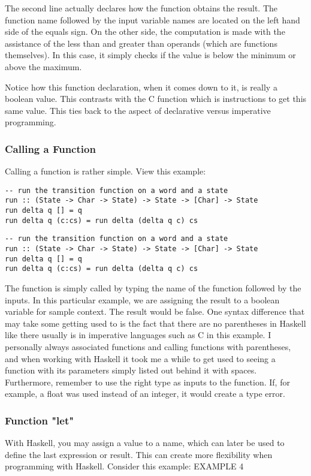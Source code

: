 \documentclass{article}
\begin{document}
\medskip\noindent
The second line actually declares how the function obtains the result. The function name followed by the input variable names are located on the left hand side of the equals sign. On the other side, the computation is made with the assistance of the less than and greater than operands (which are functions themselves). In this case, it simply checks if the value is below the minimum or above the maximum.

\medskip\noindent
Notice how this function declaration, when it comes down to it, is really a boolean value. This contrasts with the C function which is instructions to get this same value. This ties back to the aspect of declarative versus imperative programming.

\subsubsection{Calling a Function}
\medskip\noindent
Calling a function is rather simple. View this example:

\begin{lstlisting}
-- run the transition function on a word and a state
run :: (State -> Char -> State) -> State -> [Char] -> State
run delta q [] = q
run delta q (c:cs) = run delta (delta q c) cs 
\end{lstlisting}

\begin{lstlisting}
-- run the transition function on a word and a state
run :: (State -> Char -> State) -> State -> [Char] -> State
run delta q [] = q
run delta q (c:cs) = run delta (delta q c) cs 
\end{lstlisting}

\medskip\noindent
The function is simply called by typing the name of the function followed by the inputs. In this particular example, we are assigning the result to a boolean variable for sample context. The result would be false. One syntax difference that may take some getting used to is the fact that there are no parentheses in Haskell like there usually is in imperative languages such as C in this example. I personally always associated functions and calling functions with parentheses, and when working with Haskell it took me a while to get used to seeing a function with its parameters simply listed out behind it with spaces. Furthermore, remember to use the right type as inputs to the function. If, for example, a float was used instead of an integer, it would create a type error.

\subsubsection{Function "let"}
\medskip\noindent
With Haskell, you may assign a value to a name, which can later be used to define the last expression or result. This can create more flexibility when programming with Haskell. Consider this example: EXAMPLE 4
\end{document}
